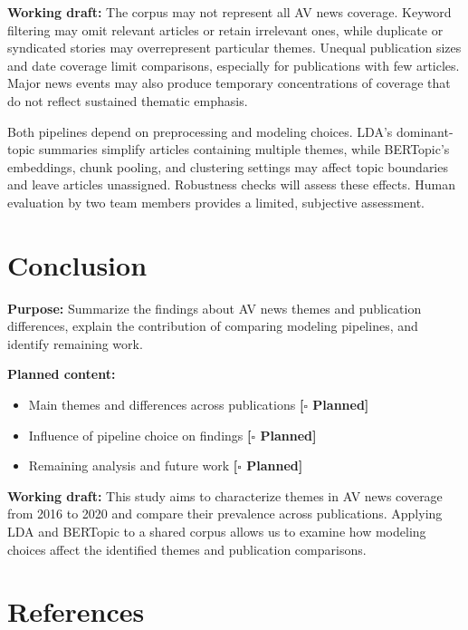 \documentclass[conference]{IEEEtran}
\newcommand{\planned}{\textcolor{blue!60!black}{\textbf{[$\square$ Planned]}}}
\begin{document}
\textbf{Working draft:}
The corpus may not represent all AV news coverage. Keyword filtering may omit relevant articles or retain irrelevant ones, while duplicate or syndicated stories may overrepresent particular themes. Unequal publication sizes and date coverage limit comparisons, especially for publications with few articles. Major news events may also produce temporary concentrations of coverage that do not reflect sustained thematic emphasis.

Both pipelines depend on preprocessing and modeling choices. LDA’s dominant-topic summaries simplify articles containing multiple themes, while BERTopic’s embeddings, chunk pooling, and clustering settings may affect topic boundaries and leave articles unassigned. Robustness checks will assess these effects. Human evaluation by two team members provides a limited, subjective assessment.

\section*{Conclusion}
\textbf{Purpose:} Summarize the findings about AV news themes and publication differences, explain the contribution of comparing modeling pipelines, and identify remaining work.

\textbf{Planned content:} 
\begin{itemize}
    \item Main themes and differences across publications \planned
    \item Influence of pipeline choice on findings \planned
    \item Remaining analysis and future work \planned
\end{itemize}

\textbf{Working draft:}
This study aims to characterize themes in AV news coverage from 2016 to 2020 and compare their prevalence across publications. Applying LDA and BERTopic to a shared corpus allows us to examine how modeling choices affect the identified themes and publication comparisons.

\newpage
\section*{References}
\printbibliography[heading=none]
\end{document}

